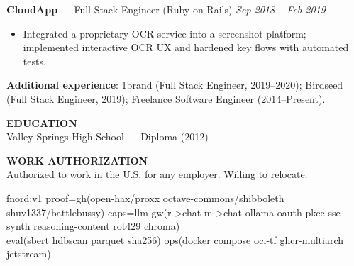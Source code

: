 \documentclass[10pt]{article}
\begin{document}
\textbf{CloudApp} --- Full Stack Engineer (Ruby on Rails) \hfill \textit{Sep 2018 -- Feb 2019}\\
\vspace{-6pt}
\begin{itemize}
  \setlength\itemsep{-2pt}
  \setlength\parskip{0pt}
  \setlength\parsep{0pt}
  \item Integrated a proprietary OCR service into a screenshot platform; implemented interactive OCR UX and hardened key flows with automated tests.
\end{itemize}

\textbf{Additional experience}: 1brand (Full Stack Engineer, 2019--2020); Birdseed (Full Stack Engineer, 2019); Freelance Software Engineer (2014--Present).

\vspace{4pt}
\textbf{EDUCATION}\\
Valley Springs High School --- Diploma (2012)

\vspace{2pt}
\textbf{WORK AUTHORIZATION}\\
Authorized to work in the U.S. for any employer. Willing to relocate.

\vspace{2pt}
{\scriptsize\ttfamily
fnord:v1\; proof=gh(open-hax/proxx octave-commons/shibboleth shuv1337/battlebussy)\; caps=llm-gw(r->chat m->chat ollama oauth-pkce sse-synth reasoning-content rot429 chroma)\\
eval(sbert hdbscan parquet sha256)\; ops(docker compose oci-tf ghcr-multiarch jetstream)
}
\end{document}
